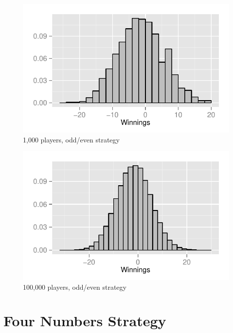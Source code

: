 \documentclass[landscape]{exam}
\begin{document}
  \begin{figure}[H]
    \centering
    \includegraphics[scale = 0.9]{figures/roulette/18_1000_50_fraction.pdf}
    \caption{1,000 players, odd/even strategy}
  \end{figure}

  \begin{figure}[H]
    \centering
    \includegraphics[scale = 0.9]{figures/roulette/18_100000_50_fraction.pdf}
    \caption{100,000 players, odd/even strategy}
  \end{figure}

  \section{Four Numbers Strategy} %
  
\end{document}
